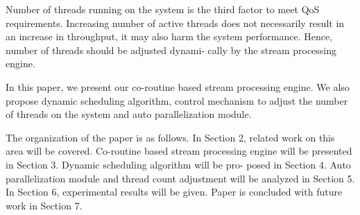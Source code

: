 Number of threads running on the system is the third factor to meet QoS
requirements. Increasing number of active threads does not necessarily result
in an increase in throughput, it may also harm the system performance. Hence,
number of threads should be adjusted dynami- cally by the stream processing
engine.

In this paper, we present our co-routine based stream processing engine. We
also propose dynamic scheduling algorithm, control mechanism to adjust the
number of threads on the system and auto parallelization module.


The organization of the paper is as follows. In Section 2, related work on
this area will be covered. Co-routine based stream processing engine will be
presented in Section 3. Dynamic scheduling algorithm will be pro- posed in
Section 4. Auto parallelization module and thread count adjustment will be
analyzed in Section 5. In Section 6, experimental results will be given. Paper
is concluded with future work in Section 7.